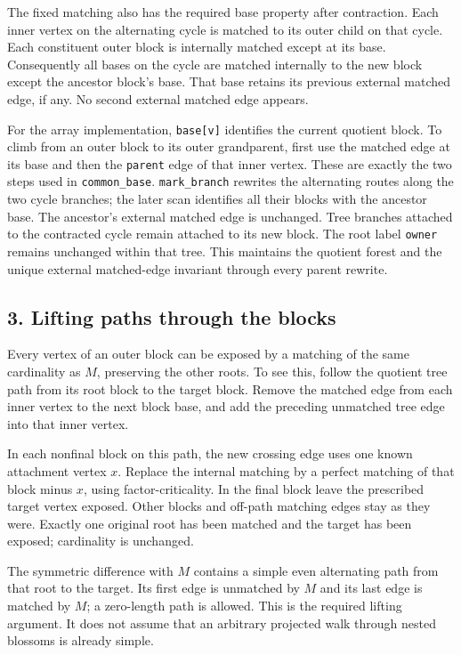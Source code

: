 The fixed matching also has the required base property after contraction. Each inner vertex on the alternating cycle is matched to its outer child on that cycle. Each constituent outer block is internally matched except at its base. Consequently all bases on the cycle are matched internally to the new block except the ancestor block's base. That base retains its previous external matched edge, if any. No second external matched edge appears.

For the array implementation, \texttt{base{[}v{]}} identifies the current quotient block. To climb from an outer block to its outer grandparent, first use the matched edge at its base and then the \texttt{parent} edge of that inner vertex. These are exactly the two steps used in \texttt{common\_base}. \texttt{mark\_branch} rewrites the alternating routes along the two cycle branches; the later scan identifies all their blocks with the ancestor base. The ancestor's external matched edge is unchanged. Tree branches attached to the contracted cycle remain attached to its new block. The root label \texttt{owner} remains unchanged within that tree. This maintains the quotient forest and the unique external matched-edge invariant through every parent rewrite.

\hypertarget{af-43f6530146-lifting-paths-through-the-blocks}{%
\subsection{3. Lifting paths through the blocks}\label{af-43f6530146-lifting-paths-through-the-blocks}}

Every vertex of an outer block can be exposed by a matching of the same cardinality as \(M\), preserving the other roots. To see this, follow the quotient tree path from its root block to the target block. Remove the matched edge from each inner vertex to the next block base, and add the preceding unmatched tree edge into that inner vertex.

In each nonfinal block on this path, the new crossing edge uses one known attachment vertex \(x\). Replace the internal matching by a perfect matching of that block minus \(x\), using factor-criticality. In the final block leave the prescribed target vertex exposed. Other blocks and off-path matching edges stay as they were. Exactly one original root has been matched and the target has been exposed; cardinality is unchanged.

The symmetric difference with \(M\) contains a simple even alternating path from that root to the target. Its first edge is unmatched by \(M\) and its last edge is matched by \(M\); a zero-length path is allowed. This is the required lifting argument. It does not assume that an arbitrary projected walk through nested blossoms is already simple.

